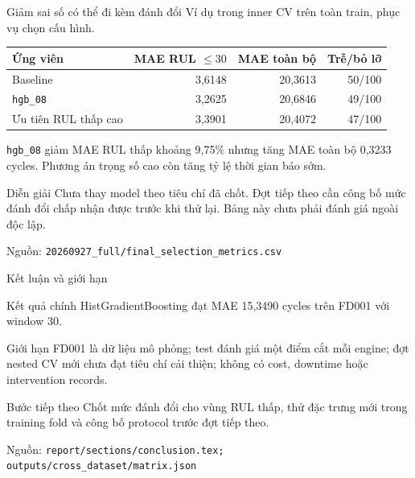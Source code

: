 \documentclass[aspectratio=169,professionalfonts]{beamer}
\newcommand{\source}[1]{\vfill\hspace{0pt}\scriptsize\color{muted}Nguồn: \nolinkurl{#1}}
\begin{document}
\begin{frame}{Giảm sai số có thể đi kèm đánh đổi}
\small
Ví dụ trong inner CV trên toàn train, phục vụ chọn cấu hình.
\begin{table}
\centering\small
\begin{tabular}{lrrr}
\toprule
Ứng viên & MAE RUL $\leq30$ & MAE toàn bộ & Trễ/bỏ lỡ\\
\midrule
Baseline & 3,6148 & 20,3613 & 50/100\\
\texttt{hgb\_08} & 3,2625 & 20,6846 & 49/100\\
Ưu tiên RUL thấp cao & 3,3901 & 20,4072 & 47/100\\
\bottomrule
\end{tabular}
\end{table}
\texttt{hgb\_08} giảm MAE RUL thấp khoảng 9,75\% nhưng tăng MAE toàn bộ
0,3233 cycles. Phương án trọng số cao còn tăng tỷ lệ thời gian báo sớm.
\begin{block}{Diễn giải}
Chưa thay model theo tiêu chí đã chốt. Đợt tiếp theo cần công bố mức đánh đổi
chấp nhận được trước khi thử lại. Bảng này chưa phải đánh giá ngoài độc lập.
\end{block}
\source{20260927_full/final_selection_metrics.csv}
\end{frame}

\begin{frame}{Kết luận và giới hạn}
\begin{block}{Kết quả chính}
HistGradientBoosting đạt MAE 15,3490 cycles trên FD001 với window 30.
\end{block}

\begin{block}{Giới hạn}
FD001 là dữ liệu mô phỏng; test đánh giá một điểm cắt mỗi engine; đợt nested CV mới chưa đạt tiêu chí cải thiện; không có cost, downtime hoặc intervention records.
\end{block}

\begin{block}{Bước tiếp theo}
Chốt mức đánh đổi cho vùng RUL thấp, thử đặc trưng mới trong training fold và công bố protocol trước đợt tiếp theo.
\end{block}
\source{report/sections/conclusion.tex; outputs/cross_dataset/matrix.json}
\end{frame}
\end{document}
